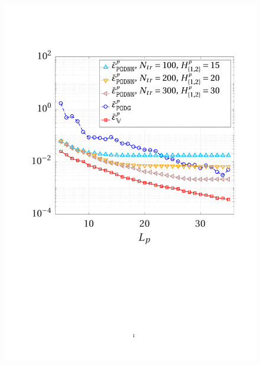 \documentclass[longtitle]{elsarticle}
\numberwithin{equation}{section}
\theoremstyle{theorem}
\theoremstyle{definition}
\theoremstyle{remark}
\theoremstyle{proposition}
\numberwithin{figure}{section}
\begin{document}
\begin{figure}[t!]
			\includegraphics[scale = 0.37, trim = {2cm 9cm 1.5cm 3.5cm}, clip]{dc_200_p_error_vs_rank}
			\hspace*{1cm}

\end{figure}
\end{document}

